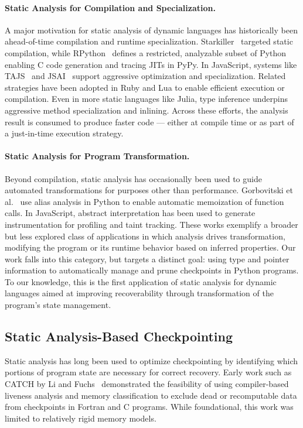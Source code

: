 \paragraph{Static Analysis for Compilation and Specialization.}
A major motivation for static analysis of dynamic languages has historically been ahead-of-time compilation and runtime specialization. Starkiller~\cite{salib2004starkiller} targeted static compilation, while RPython~\cite{ancona2007rpython} defines a restricted, analyzable subset of Python enabling C code generation and tracing JITs in PyPy. In JavaScript, systems like TAJS~\cite{jensen2009type} and JSAI~\cite{kashyap2014jsai} support aggressive optimization and specialization. Related strategies have been adopted in Ruby and Lua to enable efficient execution or compilation. Even in more static languages like Julia, type inference underpins aggressive method specialization and inlining. Across these efforts, the analysis result is consumed to produce faster code --- either at compile time or as part of a just-in-time execution strategy.

\paragraph{Static Analysis for Program Transformation.}
Beyond compilation, static analysis has occasionally been used to guide automated transformations for purposes other than performance. Gorbovitski et al.~\cite{gorbovitski2010alias} use alias analysis in Python to enable automatic memoization of function calls. In JavaScript, abstract interpretation has been used to generate instrumentation for profiling and taint tracking. These works exemplify a broader but less explored class of applications in which analysis drives transformation, modifying the program or its runtime behavior based on inferred properties. Our work falls into this category, but targets a distinct goal: using type and pointer information to automatically manage and prune checkpoints in Python programs. To our knowledge, this is the first application of static analysis for dynamic languages aimed at improving recoverability through transformation of the program’s state management.

\subsection{Static Analysis-Based Checkpointing}

Static analysis has long been used to optimize checkpointing by identifying which portions of program state are necessary for correct recovery. Early work such as CATCH by Li and Fuchs~\cite{li1990catch} demonstrated the feasibility of using compiler-based liveness analysis and memory classification to exclude dead or recomputable data from checkpoints in Fortran and C programs. While foundational, this work was limited to relatively rigid memory models.

